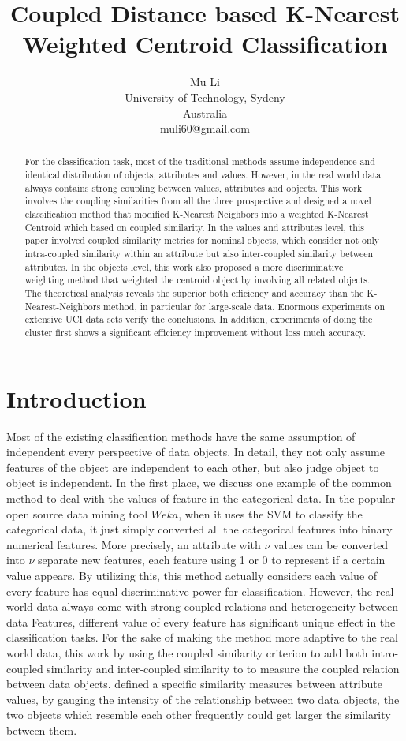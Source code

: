 \documentclass{article}
\title{Coupled Distance based K-Nearest Weighted Centroid Classification}
\author{Mu Li \\
University of Technology, Sydeny\\
Australia \\
muli60@gmail.com}
\numberwithin{equation}{section}
\begin{document}
\maketitle

\begin{abstract}
For the classification task, most of the traditional methods assume independence and identical distribution of objects, attributes and values. However, in the real world data always contains strong coupling between values, attributes and objects. This work involves the coupling similarities from all the three prospective and designed a novel classification method that modified K-Nearest Neighbors into a weighted K-Nearest Centroid which based on coupled similarity. In the values and attributes level, this paper involved coupled similarity metrics for nominal objects, which consider not only intra-coupled similarity within an attribute but also inter-coupled similarity between attributes. In the objects level, this work also proposed a more discriminative weighting method that weighted the centroid object by involving all related objects. The theoretical analysis reveals the superior both efficiency and accuracy than the K-Nearest-Neighbors method, in particular for large-scale data. Enormous experiments on extensive UCI data sets verify the conclusions. In addition, experiments of doing the cluster first shows a significant efficiency improvement without loss much accuracy.
\end{abstract}

\section{Introduction}
\label{sec:introduction}
Most of the existing classification methods have the same assumption of independent every perspective of data objects. In detail, they not only assume features of the object are independent to each other, but also judge object to object is independent. In the first place, we discuss one example of the common method to deal with the values of feature in the categorical data. In the popular open source data mining tool $Weka$, when it uses the SVM to classify the categorical data, it just simply converted all the categorical features into binary numerical features. More precisely, an attribute with $\nu$ values can be converted into $\nu$ separate new features, each feature using 1 or 0 to represent if a certain value appears. By utilizing this, this method actually considers each value of every feature has equal discriminative power for classification. However, the real world data always come with strong coupled relations and heterogeneity between data Features, different value of every feature has significant unique effect in the classification tasks. For the sake of making the method more adaptive to the real world data, this work by using the coupled similarity criterion to add both intro-coupled similarity and inter-coupled similarity to to measure the coupled relation between data objects. \cite{Gan:2007} defined a specific similarity measures between attribute values, by gauging the intensity of the relationship between two data objects, the two objects which resemble each other frequently could get larger the similarity between them.
\end{document}
